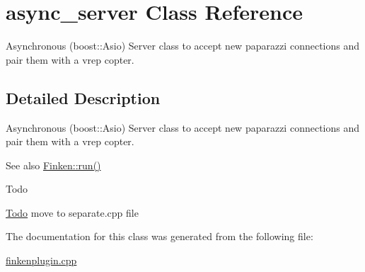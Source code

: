 \hypertarget{classasync__server}{}\section{async\+\_\+server Class Reference}
\label{classasync__server}


Asynchronous (boost\+::\+Asio) Server class to accept new paparazzi connections and pair them with a vrep copter.  




\subsection{Detailed Description}
Asynchronous (boost\+::\+Asio) Server class to accept new paparazzi connections and pair them with a vrep copter. 

\begin{DoxySeeAlso}{See also}
\hyperlink{classFinken_ae3c3abbf571407e210f4b03b68cada9d}{Finken\+::run()} 
\end{DoxySeeAlso}
\begin{DoxyRefDesc}{Todo}
\item[\hyperlink{todo__todo000002}{Todo}]move to separate.\+cpp file \end{DoxyRefDesc}


The documentation for this class was generated from the following file\+:\begin{DoxyCompactItemize}
\item 
\hyperlink{finkenplugin_8cpp}{finkenplugin.\+cpp}\end{DoxyCompactItemize}
